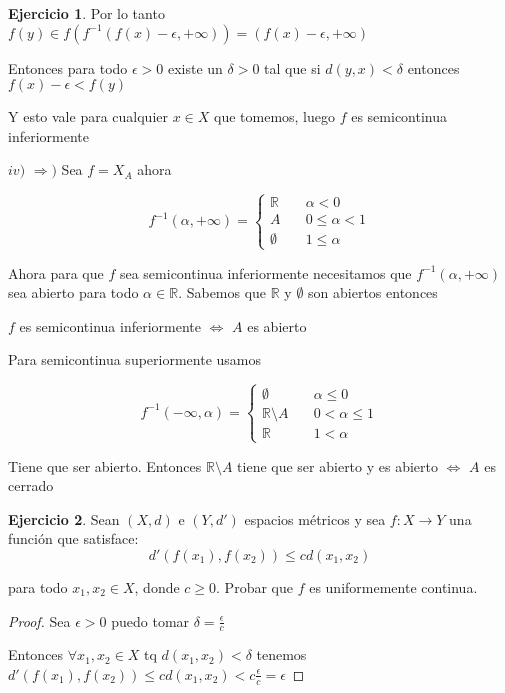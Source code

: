 \documentclass[12pt]{article}
\newcommand{\R}{\mathbb{R}}
\newcommand{\Ra}{\Rightarrow}
\newcommand{\ra}{\rightarrow}
\theoremstyle{definition}
\newtheorem{ej}{Ejercicio}
\begin{document}
\begin{ej}
Por lo tanto $f(y) \in f(f^{-1}(f(x) - \epsilon,+\infty)) = (f(x) - \epsilon ,+\infty)$

Entonces para todo $\epsilon >0 $ existe un $\delta >0$ tal que si $d(y,x) < \delta$ entonces $f(x) - \epsilon < f(y)$

Y esto vale para cualquier $x \in X$ que tomemos, luego $f$ es semicontinua inferiormente 

$iv)$ $\Ra )$ Sea $f = X_A$ ahora 

$$
f^{-1}(\alpha,+\infty) = \left\{
        \begin{array}{ll}
            \R & \quad \alpha < 0 \\
            A & \quad 0 \leq \alpha < 1 \\
	  \emptyset & \quad 1 \leq \alpha
        \end{array}
    \right.
$$

Ahora para que $f$ sea semicontinua inferiormente necesitamos que $f^{-1}(\alpha,+\infty)$ sea abierto para todo $\alpha \in \R$. Sabemos que $\R$ y $\emptyset$ son abiertos entonces 

$f$ es semicontinua inferiormente $\iff$ $A$ es abierto 

Para semicontinua superiormente usamos 

$$
f^{-1}(-\infty,\alpha) = \left\{
        \begin{array}{ll}
            \emptyset & \quad \alpha \leq 0 \\
            \R \setminus A & \quad 0 < \alpha \leq 1 \\
	 \R& \quad 1 < \alpha
        \end{array}
    \right.
$$

Tiene que ser abierto. Entonces $\R \setminus A$ tiene que ser abierto y es abierto $\iff$ $A$ es cerrado 
 \end{ej}
 \begin{ej}
   Sean $(X,d)$ e $(Y,d')$ espacios métricos y sea $f: X \ra Y$ una función que satisface:
   $$d'(f(x_1),f(x_2)) \leq c d(x_1,x_2) $$

   \noindent para todo $x_1,x_2 \in X$, donde $c \geq 0$. Probar que $f$ es uniformemente continua.
 \end{ej}
 \begin{proof}
   Sea $\epsilon >0$ puedo tomar $\delta = \frac{\epsilon}{c}$

 \noindent  Entonces $\forall x_1,x_2 \in X $ tq $d(x_1,x_2) < \delta$ tenemos $d'(f(x_1),f(x_2)) \leq cd(x_1,x_2) < c \frac{\epsilon}{c} = \epsilon$
 \end{proof}
\end{document}
